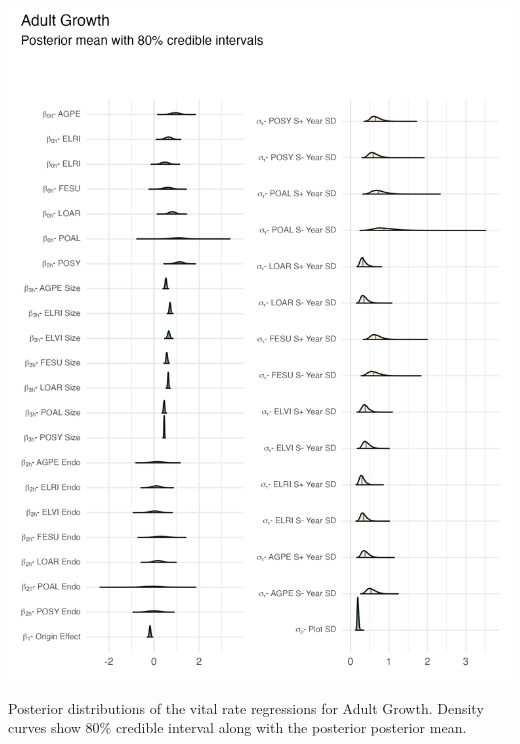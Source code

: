 \documentclass[lineno, sn-basic]{sn-jnl}%
\providecommand{\DIFaddbegin}{} %
\providecommand{\DIFaddend}{} %
\providecommand{\DIFdelbegin}{} %
\providecommand{\DIFdelend}{} %
\providecommand{\DIFaddbeginFL}{} %
\providecommand{\DIFaddendFL}{} %
\providecommand{\DIFdelbeginFL}{} %
\providecommand{\DIFdelendFL}{} %
\newcommand{\DIFscaledelfig}{0.5}
\newlength{\DIFdelgraphicswidth} %
\newlength{\DIFdelgraphicsheight} %
\newcommand{\DIFaddincludegraphics}[2][]{{\color{blue}\fbox{\DIFOincludegraphics[#1]{#2}}}} %
\newcommand{\DIFdelincludegraphics}[2][]{%
\sbox{\DIFdelgraphicsbox}{\DIFOincludegraphics[#1]{#2}}%
\settoboxwidth{\DIFdelgraphicswidth}{\DIFdelgraphicsbox} %
\settoboxtotalheight{\DIFdelgraphicsheight}{\DIFdelgraphicsbox} %
\scalebox{\DIFscaledelfig}{%
\parbox[b]{\DIFdelgraphicswidth}{\usebox{\DIFdelgraphicsbox}\\[-\baselineskip] \rule{\DIFdelgraphicswidth}{0em}}\llap{\resizebox{\DIFdelgraphicswidth}{\DIFdelgraphicsheight}{%
\setlength{\unitlength}{\DIFdelgraphicswidth}%
\begin{picture}(1,1)%
\thicklines\linethickness{2pt} %
{\color[rgb]{1,0,0}\put(0,0){\framebox(1,1){}}}%
{\color[rgb]{1,0,0}\put(0,0){\line( 1,1){1}}}%
{\color[rgb]{1,0,0}\put(0,1){\line(1,-1){1}}}%
\end{picture}%
}\hspace*{3pt}}} %
} %
\DeclareRobustCommand{\DIFaddbegin}{\DIFOaddbegin \let\includegraphics\DIFaddincludegraphics} %
\DeclareRobustCommand{\DIFaddend}{\DIFOaddend \let\includegraphics\DIFOincludegraphics} %
\DeclareRobustCommand{\DIFdelbegin}{\DIFOdelbegin \let\includegraphics\DIFdelincludegraphics} %
\DeclareRobustCommand{\DIFdelend}{\DIFOaddend \let\includegraphics\DIFOincludegraphics} %
\DeclareRobustCommand{\DIFaddbeginFL}{\DIFOaddbeginFL \let\includegraphics\DIFaddincludegraphics} %
\DeclareRobustCommand{\DIFaddendFL}{\DIFOaddendFL \let\includegraphics\DIFOincludegraphics} %
\DeclareRobustCommand{\DIFdelbeginFL}{\DIFOdelbeginFL \let\includegraphics\DIFdelincludegraphics} %
\DeclareRobustCommand{\DIFdelendFL}{\DIFOaddendFL \let\includegraphics\DIFOincludegraphics} %
\begin{document}
\DIFdelbegin %
\DIFdelendFL \DIFaddbeginFL \begin{myfigure}[H]
	\DIFaddendFL \centering
	\includegraphics[width = \linewidth]{grow_posteriors_plot.png}
	\DIFdelbeginFL %
\DIFdelendFL \DIFaddbeginFL \caption[Posterior distributions of the vital rate regressions for Adult Growth]{\DIFaddendFL Posterior distributions of the vital rate regressions for Adult Growth. Density curves show $80\%$ credible interval along with the posterior posterior mean.}
\DIFdelbeginFL %
\DIFdelend \DIFaddbegin \end{myfigure}
\DIFaddend 
\end{document}

